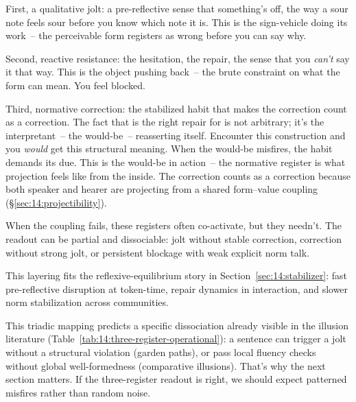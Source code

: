 First, a qualitative jolt: a pre-reflective sense that something's off, the way a sour note feels sour before you know which note it is. This is the sign-vehicle doing its work~-- the perceivable form registers as wrong before you can say why.

Second, reactive resistance: the hesitation, the repair, the sense that you \emph{can't} say it that way. This is the object pushing back~-- the brute constraint on what the form can mean. You feel blocked.

Third, normative correction: the stabilized habit that makes the correction count as a correction. The fact that  is the right repair for \ungram{} is not arbitrary; it's the interpretant~-- the would-be~-- reasserting itself. Encounter this construction and you \emph{would} get this structural meaning. When the would-be misfires, the habit demands its due. This is the would-be in action~-- the normative register is what projection feels like from the inside. The correction counts as a correction because both speaker and hearer are projecting from a shared form--value coupling (§\ref{sec:14:projectibility}).

When the coupling fails, these registers often co-activate, but they needn't. The readout can be partial and dissociable: jolt without stable correction, correction without strong jolt, or persistent blockage with weak explicit norm talk.

This layering fits the reflexive-equilibrium story in Section~\ref{sec:14:stabilizer}: fast pre-reflective disruption at token-time, repair dynamics in interaction, and slower norm stabilization across communities.

This triadic mapping predicts a specific dissociation already visible in the illusion literature (Table~\ref{tab:14:three-register-operational}): a sentence can trigger a jolt without a structural violation (garden paths), or pass local fluency checks without global well-formedness (comparative illusions). That's why the next section matters. If the three-register readout is right, we should expect patterned misfires rather than random noise.

